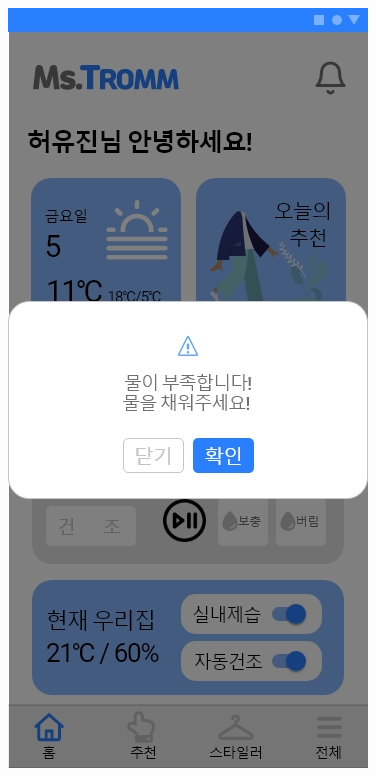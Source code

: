 \documentclass[conference]{IEEEtran}
\begin{document}
\begin{enumerate}
\centerline{\includegraphics[scale=0.25]{8. 스타일러 알림.jpg}
}
\end{enumerate}
\end{document}
